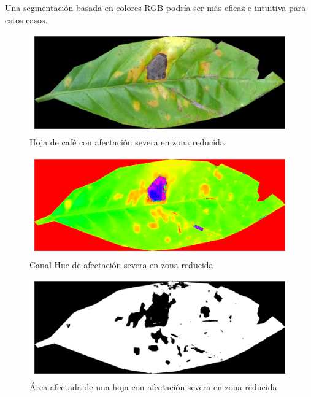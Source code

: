 Una segmentación basada en colores \textsf{RGB} podría ser más eficaz e intuitiva para estos casos.

\begin{figure}[H]
\centering
\includegraphics[scale=1]{images/consideration_severity_rgb.png}
\caption{Hoja de café con afectación severa en zona reducida}
\label{img:issue_severity_rgb}
\end{figure}

\begin{figure}[H]
\centering
\includegraphics[scale=1]{images/consideration_severity_hue.png}
\caption{Canal Hue de afectación severa en zona reducida}
\label{img:issue_severity_hue}
\end{figure}

\begin{figure}[H]
\centering
\includegraphics[scale=1]{images/consideration_severity_binary.png}
\caption{Área afectada de una hoja con afectación severa en zona reducida}
\label{img:issue_severity_binary}
\end{figure}

